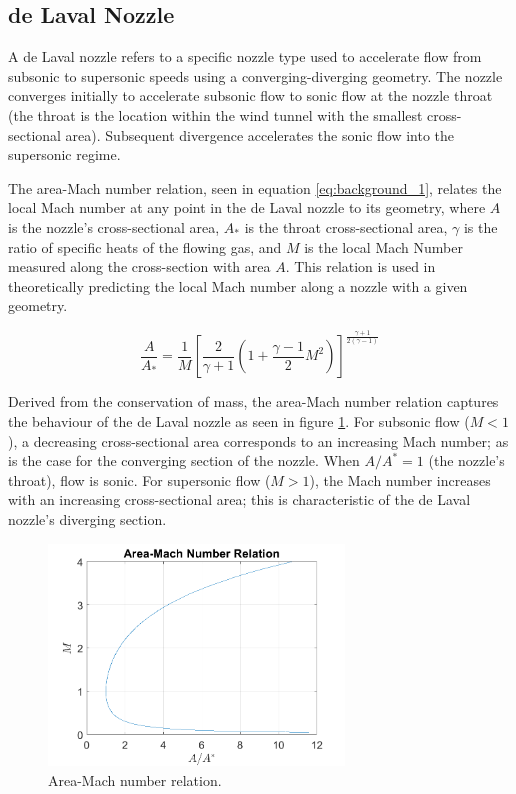 \documentclass[runningheads]{llncs}
\begin{document}
\subsection{de Laval Nozzle}

A de Laval nozzle refers to a specific nozzle type used to accelerate flow from subsonic to supersonic speeds using a converging-diverging geometry. The nozzle converges initially to accelerate subsonic flow to sonic flow at the nozzle throat (the throat is the location within the wind tunnel with the smallest cross-sectional area). Subsequent divergence accelerates the sonic flow into the supersonic regime.\newline

\noindent
The area-Mach number relation, seen in equation \ref{eq:background_1}, relates the local Mach number at any point in the de Laval nozzle to its geometry, where $A$ is the nozzle's cross-sectional area, $A_*$ is the throat cross-sectional area, $\gamma$ is the ratio of specific heats of the flowing gas, and $M$ is the local Mach Number measured along the cross-section with area $A$. This relation is used in theoretically predicting the local Mach number along a nozzle with a given geometry.

\begin{equation}
    \frac{A}{A_*}=\frac{1}{M}\left[\frac{2}{\gamma + 1}\left(1 + \frac{\gamma - 1}{2}M^2\right)\right]^{\frac{\gamma + 1}{2(\gamma - 1)}}
    \label{eq:background_1}
\end{equation}

\noindent
Derived from the conservation of mass, the area-Mach number relation captures the behaviour of the de Laval nozzle as seen in figure \ref{fig:AM_relation}. For subsonic flow ($M<1$), a decreasing cross-sectional area corresponds to an increasing Mach number; as is the case for the converging section of the nozzle. When $A/A^*=1$ (the nozzle's throat), flow is sonic. For supersonic flow ($M>1$), the Mach number increases with an increasing cross-sectional area; this is characteristic of the de Laval nozzle's diverging section.

\begin{figure}
    \centering
    \includegraphics[width=0.7\textwidth]{figures/area_Mach_relation.png}
    \caption{Area-Mach number relation.}
    \label{fig:AM_relation}
\end{figure}
\end{document}
